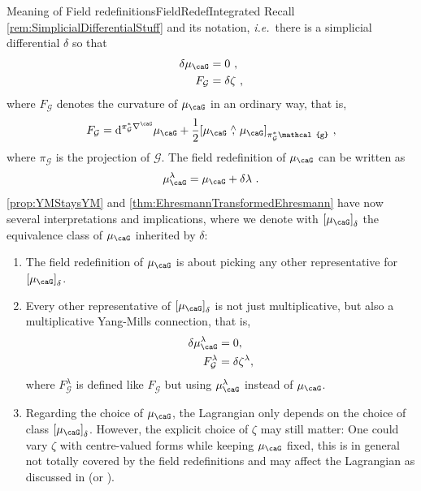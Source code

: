 \documentclass[reqno,a4paper,oneside]{amsart}
\newcommand\mutot{\mu_\caG}
\theoremstyle{plain}
\theoremstyle{remark}
\theoremstyle{definition}
\begin{document}
\begin{remarks}{Meaning of Field redefinitions}{FieldRedefIntegrated}
Recall \ref{rem:SimplicialDifferentialStuff} and its notation, \textit{i.e.}\ there is a simplicial differential $\delta$ so that
\begin{align*}
\delta \mutot &= 0~,\\
F_{\mathcal{G}} &= \delta\zeta~,
\end{align*}
where $F_{\mathcal{G}}$ denotes the curvature of $\mutot$ in an ordinary way, that is,
\begin{equation*}
F_{\mathcal{G}}
=
\mathrm{d}^{\pi_{\mathcal{G}}^*\nabla^\caG} \mutot
	+ \frac{1}{2} \mleft[ \mutot \stackrel{\wedge}{,} \mutot \mright]_{\pi_{\mathcal{G}}^*\mathcal{g}}~,
\end{equation*}
where $\pi_{\mathcal{G}}$ is the projection of $\mathcal{G}$.
The field redefinition of $\mutot$ can be written as
\begin{equation*}
\mutot^{\lambda}
=
\mutot
	+ \delta \lambda ~ .
\end{equation*}
\ref{prop:YMStaysYM} and \ref{thm:EhresmannTransformedEhresmann} have now several interpretations and implications, where we denote with $\mleft[\mutot\mright]_{\delta}$ the equivalence class of $\mutot$ inherited by $\delta$:
\begin{enumerate}
	\item The field redefinition of $\mutot$ is about picking any other representative for $\mleft[\mutot\mright]_{\delta}$.
	\item Every other representative of $\mleft[\mutot\mright]_{\delta}$ is not just multiplicative, but also a multiplicative Yang-Mills connection, that is,
	\begin{align*}
	\delta \mutot^{\lambda} &= 0,\\
	F_{\mathcal{G}}^{\lambda} &= \delta\zeta^{\lambda},
	\end{align*}
	where $F_{\mathcal{G}}^{\lambda}$ is defined like $F_{\mathcal{G}}$ but using $\mutot^{\lambda}$ instead of $\mutot$.
	\item Regarding the choice of $\mutot$, the Lagrangian only depends on the choice of class $\mleft[\mutot\mright]_{\delta}$. However, the explicit choice of $\zeta$ may still matter: One could vary $\zeta$ with centre-valued forms while keeping $\mutot$ fixed, this is in general not totally covered by the field redefinitions and may affect the Lagrangian as discussed in \cite{MyThesis} (or \cite{My1stpaper}).
\end{enumerate}
\end{remarks}
\end{document}
